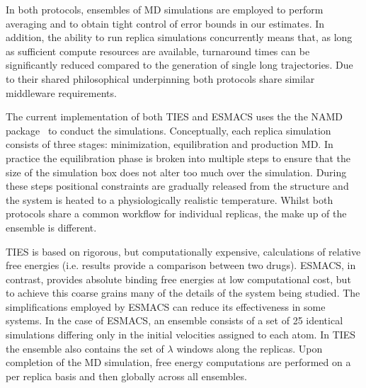In both protocols, ensembles of MD simulations are employed to perform 
averaging and to obtain tight control of error bounds in our estimates. In 
addition, the ability to run replica simulations concurrently means that, as 
long as sufficient compute resources are available, turnaround times can be  
significantly reduced compared to the generation of single long trajectories. 
Due to their shared philosophical underpinning both protocols share similar 
middleware requirements.


The current implementation of both TIES and ESMACS uses the the NAMD 
package~\cite{Phillips2005} to conduct the simulations. Conceptually, each 
replica simulation consists of three stages: minimization, equilibration and 
production MD. In practice the equilibration phase is broken into multiple 
steps to ensure that the size of the simulation box does not alter too much 
over the simulation. During these steps positional constraints are gradually 
released from the structure and the system is heated to a physiologically 
realistic temperature. Whilst both protocols share a common workflow for 
individual replicas, the make up of the ensemble is different.


TIES is based on rigorous, but computationally expensive, calculations of 
relative free energies (i.e. results provide a comparison between two drugs). 
ESMACS, in contrast, provides absolute binding free energies at low 
computational cost, but to achieve this coarse grains many of the details of 
the system being studied. The simplifications employed by ESMACS can reduce its 
effectiveness in some systems. In the case of ESMACS, an ensemble consists of a 
set of 25 identical simulations differing only in the initial velocities 
assigned to each atom. In TIES the ensemble also contains the set of $\lambda$ 
windows along the replicas. Upon completion of the MD simulation, free energy 
computations are performed on a per replica basis and then globally across all 
ensembles. 





